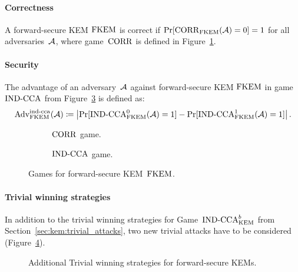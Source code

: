 \paragraph{Correctness} A forward-secure KEM $\mathrm{FKEM}$ is correct if $\Pr[\mathrm{CORR}_{\mathrm{FKEM}}(\mathcal{A})=0]=1$ for all adversaries~$\mathcal{A}$, where game~$\mathrm{CORR}$ is defined in Figure~\ref{fig:fkem:corr}.

\paragraph{Security}
The advantage of an adversary~$\mathcal{A}$ against forward-secure KEM $\mathrm{FKEM}$ in game ${\mathrm{IND}\text{-}\mathrm{CCA}}$ from Figure~\ref{fig:fkem:ind} is defined as:
\[
\mathrm{Adv}_{\mathrm{FKEM}}^{\mathrm{ind}\text{-}\mathrm{cca}}(\mathcal{A})\coloneqq\left|\Pr[{\mathrm{IND}\text{-}\mathrm{CCA}}_{\mathrm{FKEM}}^0(\mathcal{A})=1]-\Pr[{\mathrm{IND}\text{-}\mathrm{CCA}}_{\mathrm{FKEM}}^1(\mathcal{A})=1]\right|\text{.}
\]

\begin{figure}[!ht]
    \begin{subfigure}{.49\textwidth}
        \centering
        \nicoresetlinenr%
        \fbox{%
            \scalebox{\codescalefactor}{%
            }%
        }
        \caption{%
            $\mathrm{CORR}$ game.
        }
        \label{fig:fkem:corr}    
    \end{subfigure}
    \hfill
    \begin{subfigure}{.49\textwidth}
        \centering
        \nicoresetlinenr%
        \fbox{%
            \scalebox{\codescalefactor}{%
            }%
        }
        \caption{%
            ${\mathrm{IND}\text{-}\mathrm{CCA}}$ game.
        }
        \label{fig:fkem:ind}
    \end{subfigure}
    \caption{Games for forward-secure KEM~$\mathrm{FKEM}$.}
\end{figure}

\paragraph{Trivial winning strategies} In addition to the trivial winning strategies for Game~${\mathrm{IND}\text{-}\mathrm{CCA}}^b_{\mathrm{KEM}}$ from Section~\ref{sec:kem:trivial_attacks}, two new trivial attacks have to be considered (Figure~\ref{fig:fkem:triv}).

\begin{figure}[!ht]%
    \centering
    
    \caption{Additional Trivial winning strategies for forward-secure KEMs.}
    \label{fig:fkem:triv}
\end{figure}

